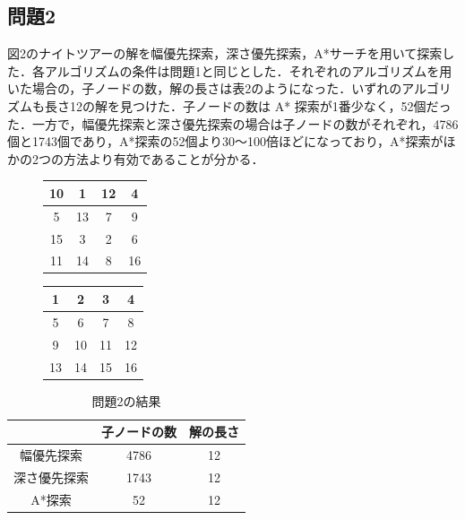 \documentclass[a4paper, twocolumn]{ltjsarticle}
\begin{document}
\subsection*{問題2}
図2のナイトツアーの解を幅優先探索，深さ優先探索，A*サーチを用いて探索した．各アルゴリズムの条件は問題1と同じとした．それぞれのアルゴリズムを用いた場合の，子ノードの数，解の長さは表2のようになった．いずれのアルゴリズムも長さ12の解を見つけた．子ノードの数は A* 探索が1番少なく，52個だった．一方で，幅優先探索と深さ優先探索の場合は子ノードの数がそれぞれ，4786個と1743個であり，A*探索の52個より30～100倍ほどになっており，A*探索がほかの2つの方法より有効であることが分かる．
\begin{figure}[ht]
    \centering
    \begin{minipage}{0.45\linewidth}
        \centering
        \begin{tabular}{|@{\hskip 3.5pt}c@{\hskip 3.5pt}|@{\hskip 3.5pt}c@{\hskip 3.5pt}|@{\hskip 3.5pt}c@{\hskip 3.5pt}|@{\hskip 3.5pt}c@{\hskip 3.5pt}|}
            \hline
            10 & 1 & 12 & 4\\ \hline
            5 & 13 & 7 & 9\\ \hline
            15 & 3 & 2 & 6\\ \hline
            11 & 14 & 8 & 16\\ \hline
        \end{tabular}
    \end{minipage}
    \hfill
    \begin{minipage}{0.45\linewidth}
        \centering
        \begin{tabular}{|@{\hskip 3.5pt}c@{\hskip 3.5pt}|@{\hskip 3.5pt}c@{\hskip 3.5pt}|@{\hskip 3.5pt}c@{\hskip 3.5pt}|@{\hskip 3.5pt}c@{\hskip 3.5pt}|}
            \hline
            1 & 2 & 3 & 4\\ \hline
            5 & 6 & 7 & 8\\ \hline
            9 & 10 & 11 & 12\\ \hline
            13 & 14 & 15 & 16\\ \hline
        \end{tabular}
    \end{minipage}
    \caption{}
\end{figure}
\begin{table}[h]
    \centering
    \begin{tabular}{@{}c|cc@{}}
        \hline
        & 子ノードの数 & 解の長さ\\
        \hline
        幅優先探索 & 4786 & 12 \\ 
        深さ優先探索 & 1743 & 12 \\ 
        A*探索 & 52 & 12 \\ 
        \hline
    \end{tabular}
    \caption{問題2の結果}
\end{table}
\newpage
\end{document}
